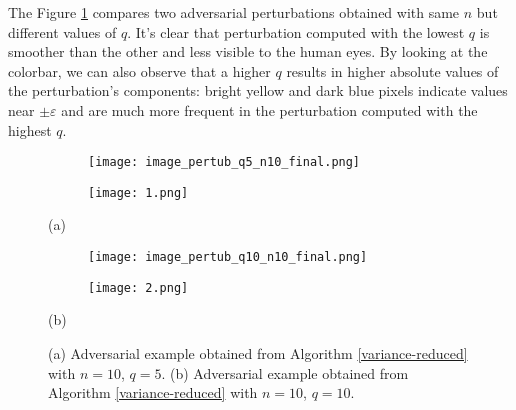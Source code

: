 The Figure \ref{fig:vred} compares two adversarial perturbations obtained with same $n$ but different values of $q$. It's clear that perturbation computed with the lowest $q$ is smoother than the other and less visible to the human eyes. By looking at the colorbar, we can also observe that a higher $q$ results in higher absolute values of the perturbation's components: bright yellow and dark blue pixels indicate values near $\pm\varepsilon$ and are much more frequent in the perturbation computed with the highest $q$.
\begin{figure}%
	\begin{subfigure}[b]{0.15\textwidth}
		\texttt{[image: image\_pertub\_q5\_n10\_final.png]}
	\end{subfigure}
	\hspace{2.5cm}
	\begin{subfigure}[b]{0.15\textwidth}
		\texttt{[image: 1.png]}
	\end{subfigure}
	\newline
	\centerline{(a)}
	\begin{subfigure}[b]{0.15\textwidth}
		\texttt{[image: image\_pertub\_q10\_n10\_final.png]}
	\end{subfigure}
	\hspace{2.5cm}
	\begin{subfigure}[b]{0.15\textwidth}
		\texttt{[image: 2.png]}
	\end{subfigure}
	\newline
	\centerline{(b)}
	\caption{{\small (a) Adversarial example obtained from Algorithm \ref{variance-reduced} with $n=10$, $q=5$. (b) Adversarial example obtained from Algorithm \ref{variance-reduced} with $n=10$, $q=10$.}  }
	\label{fig:vred}
\end{figure}

